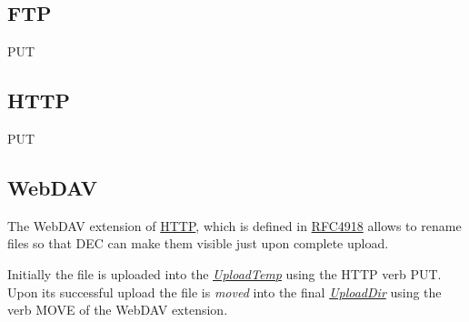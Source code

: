 \documentclass[dec_sum_main.tex]{subfiles}
\begin{document}
\subsection{FTP}
PUT

\subsection{HTTP}
PUT

\subsection{WebDAV}
The WebDAV extension of \href{https://www.w3.org/Protocols/rfc2616/rfc2616-sec9.html}{HTTP}, which is defined in \href{https://tools.ietf.org/html/rfc4918}{RFC4918} allows to rename files so that DEC can make them visible just upon complete upload.

\par
\noindent
Initially the file is uploaded into the \hyperref[UploadTemp]{\textit{UploadTemp}} using the HTTP verb PUT. Upon its successful upload the file is \textit{moved} into the final \hyperref[UploadDir]{\textit{UploadDir}} using the verb MOVE of the WebDAV extension.
\end{document}

